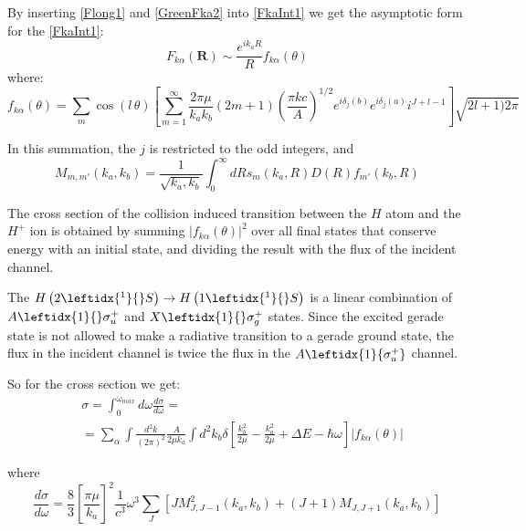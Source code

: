 By inserting \eqref{Flong1} and \eqref{GreenFka2} into \eqref{FkaInt1} we get the asymptotic form for the  \eqref{FkaInt1}:
\begin{equation}\label{FlongAA1}
F_{k\alpha}(\mathbf{R}) \sim \frac{e^{ik_aR}}{R}f_{k\alpha}(\theta)
\end{equation}
where:
\begin{equation}\label{fkaa1}
f_{k\alpha}(\theta) = \sum_{m}{\cos(l\,\theta)\left[\sum_{m=1}^{\infty}{\frac{2\pi\mu}{k_ak_b}(2m+1)\left(\frac{\pi k c}{A}\right)^{1/2}e^{i\delta_j(b)}e^{i\delta_j(a)}i^{J+l-1} }\right]\sqrt{2l+1)2\pi}}
\end{equation}

In this summation, the $ j $ is restricted to the odd integers, and 
\begin{equation}\label{Mll1}
M_{m,m'}(k_a,k_b) = \frac{1}{\sqrt{k_a,k_b}}\int_0^{\infty}{dRs_m(k_a,R)D(R)f_{m'}(k_b,R)} 
\end{equation}

The cross section of the collision induced transition between the $ H $ atom and the $ H^{+} $ ion is obtained by summing $ \left|f_{k\alpha}(\theta)\right|^2 $ over all final states that conserve energy with an initial state, and dividing the result with the flux of the incident channel.

The $ H\left(2 \leftidx{^1}{}S\right) \rightarrow H\left(1 \leftidx{^1}{}S\right) $ is a linear combination of $ A \leftidx{1}{}\sigma_u^{+} $ and $ X \leftidx{1}{}\sigma_g^{+} $ states. Since the excited gerade state is not allowed to make a radiative transition to a gerade ground state, the flux in the incident channel is twice the flux in the $ A \leftidx{1}{\sigma_u^{+}} $ channel.

So for the cross section we get:
\begin{equation}\label{crs1}
\begin{split}
& \sigma = \int_0^{\omega_{max}}{d\omega\frac{d\sigma}{d\omega}} = \\[.8em]
& = \sum_{\alpha}{\int{\frac{d^2k}{(2\pi)^2}\frac{A}{2\mu k_a}\int{d^2k_b\delta\left[\frac{k_b^2}{2\mu} - \frac{k_a^2}{2\mu} + \Delta E - \hbar\omega \right]\left|f_{k\alpha}(\theta) \right| } } }
\end{split}
\end{equation}

where
\begin{equation}\label{diffcrs1}
\frac{d\sigma}{d\omega} = \frac{8}{3}\left[\frac{\pi \mu}{k_a}\right]^2 \frac{1}{c^3}\omega^3 \sum_{J}{\left[J M_{J,J-1}^2(k_a,k_b) + (J+1)M_{J,J+1}(k_a,k_b)\right] }
\end{equation}

